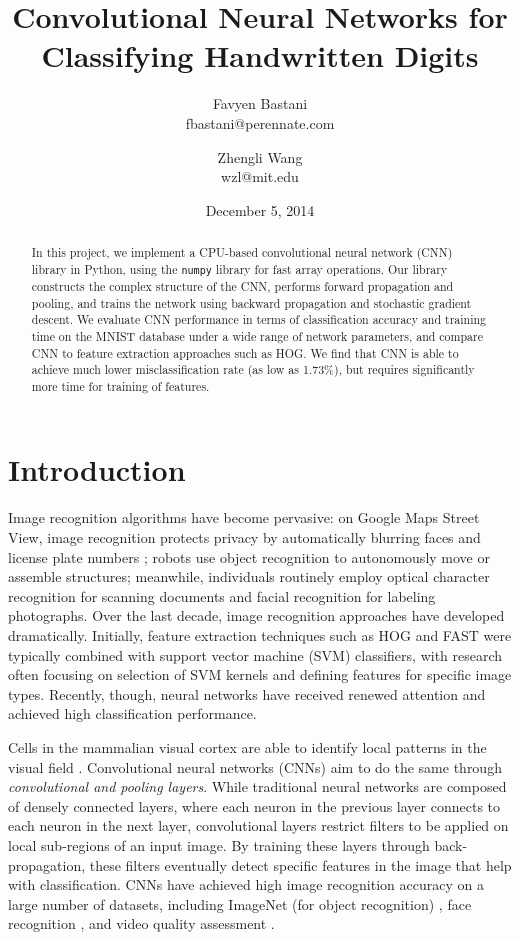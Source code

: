 \documentclass[10pt,twocolumn]{article}
\title{Convolutional Neural Networks for Classifying Handwritten Digits}
\date{December 5, 2014}
\author{
	Favyen Bastani \\
	fbastani@perennate.com
	\and
	Zhengli Wang \\
	wzl@mit.edu
}
\begin{document}
\maketitle

\begin{abstract}
In this project, we implement a CPU-based convolutional neural network (CNN) library in Python, using the \texttt{numpy} library for fast array operations. Our library constructs the complex structure of the CNN, performs forward propagation and pooling, and trains the network using backward propagation and stochastic gradient descent. We evaluate CNN performance in terms of classification accuracy and training time on the MNIST database under a wide range of network parameters, and compare CNN to feature extraction approaches such as HOG. We find that CNN is able to achieve much lower misclassification rate (as low as 1.73\%), but requires significantly more time for training of features.
\end{abstract}

\section{Introduction} \label{sec:introduction}

Image recognition algorithms have become pervasive: on Google Maps Street View, image recognition protects privacy by automatically blurring faces and license plate numbers \cite{streetview}; robots use object recognition to autonomously move or assemble structures; meanwhile, individuals routinely employ optical character recognition for scanning documents and facial recognition for labeling photographs. Over the last decade, image recognition approaches have developed dramatically. Initially, feature extraction techniques such as HOG and FAST were typically combined with support vector machine (SVM) classifiers, with research often focusing on selection of SVM kernels and defining features for specific image types. Recently, though, neural networks have received renewed attention and achieved high classification performance.

Cells in the mammalian visual cortex are able to identify local patterns in the visual field \cite{website:lenet}. Convolutional neural networks (CNNs) aim to do the same through \emph{convolutional and pooling layers}. While traditional neural networks are composed of densely connected layers, where each neuron in the previous layer connects to each neuron in the next layer, convolutional layers restrict filters to be applied on local sub-regions of an input image. By training these layers through back-propagation, these filters eventually detect specific features in the image that help with classification. CNNs have achieved high image recognition accuracy on a large number of datasets, including ImageNet (for object recognition) \cite{imagenet}, face recognition \cite{facerec}, and video quality assessment \cite{videoquality}.
\end{document}
